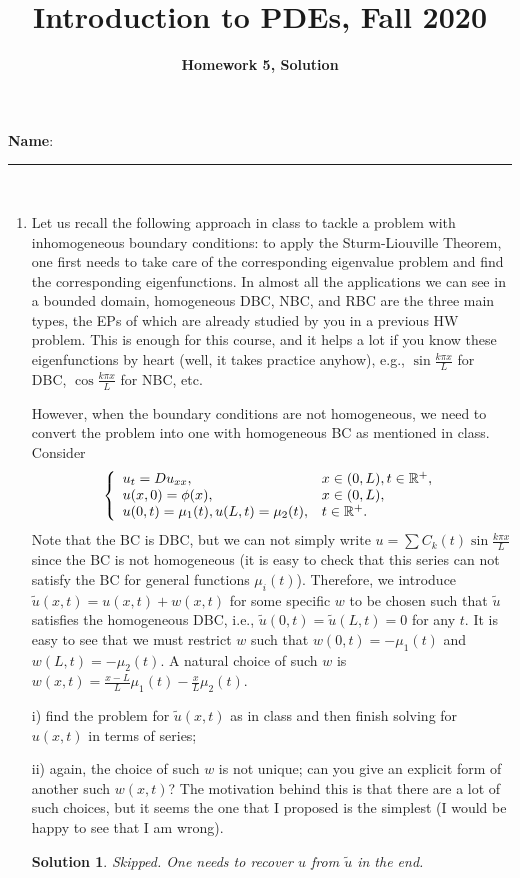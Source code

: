 \documentclass[6pt]{article}
\title{Introduction to PDEs, Fall 2020}
\author{\textbf{Homework 5, Solution}}
\date{}
\newtheorem{solution}{Solution}
\numberwithin{equation}{section}
\def\mathbb{\Bbb}
\begin{document}
\maketitle

\textbf{Name}:\rule{1 in}{0.001 in} \\
\begin{enumerate}
\item Let us recall the following approach in class to tackle a problem with inhomogeneous boundary conditions: to apply the Sturm-Liouville Theorem, one first needs to take care of the corresponding eigenvalue problem and find the corresponding eigenfunctions.  In almost all the applications we can see in a bounded domain, homogeneous DBC, NBC, and RBC are the three main types, the EPs of which are already studied by you in a previous HW problem.  This is enough for this course, and it helps a lot if you know these eigenfunctions by heart (well, it takes practice anyhow), e.g., $\sin\frac{k\pi x}{L}$ for DBC, $\cos\frac{k\pi x}{L}$ for NBC, etc.

However, when the boundary conditions are not homogeneous, we need to convert the problem into one with homogeneous BC as mentioned in class.  Consider
\begin{equation}\label{mu12}
\left\{
\begin{array}{ll}
u_t=Du_{xx},& x\in(0,L),t\in\mathbb R^+,\\
u(x,0)=\phi(x),&x\in(0,L),\\
u(0,t)=\mu_1(t), u(L,t)=\mu_2(t), &t\in\mathbb R^+.
\end{array}
\right.
\end{equation}
Note that the BC is DBC, but we can not simply write $u=\sum C_k(t)\sin\frac{k\pi x}{L}$ since the BC is not homogeneous (it is easy to check that this series can not satisfy the BC for general functions $\mu_i(t)$).  Therefore, we introduce $\tilde u(x,t)=u(x,t)+w(x,t)$ for some specific $w$ to be chosen such that $\tilde u$ satisfies the homogeneous DBC, i.e., $\tilde u(0,t)=\tilde u(L,t)=0$ for any $t$.  It is easy to see that we must restrict $w$ such that $w(0,t)=-\mu_1(t)$ and $w(L,t)=-\mu_2(t)$.  A natural choice of such $w$ is $w(x,t)=\frac{x-L}{L}\mu_1(t)-\frac{x}{L}\mu_2(t)$.

i) find the problem for $\tilde u(x,t)$ as in class and then finish solving for $u(x,t)$ in terms of series;

ii) again, the choice of such $w$ is not unique; can you give an explicit form of another such $w(x,t)$?  The motivation behind this is that there are a lot of such choices, but it seems the one that I proposed is the simplest (I would be happy to see that I am wrong).
\begin{solution}
Skipped.  One needs to recover $u$ from $\tilde u$ in the end.
\end{solution}


\end{enumerate}
\end{document}
